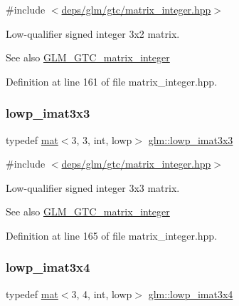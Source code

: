 {\ttfamily \#include $<$\hyperlink{matrix__integer_8hpp}{deps/glm/gtc/matrix\+\_\+integer.\+hpp}$>$}

Low-\/qualifier signed integer 3x2 matrix. \begin{DoxySeeAlso}{See also}
\hyperlink{group__gtc__matrix__integer}{G\+L\+M\+\_\+\+G\+T\+C\+\_\+matrix\+\_\+integer} 
\end{DoxySeeAlso}


Definition at line 161 of file matrix\+\_\+integer.\+hpp.

\mbox{\label{group__gtc__matrix__integer_ga4bfcfb2b121f76d9bff2fb2e4017173a}} 
\subsubsection{\texorpdfstring{lowp\+\_\+imat3x3}{lowp\_imat3x3}}
{\footnotesize\ttfamily typedef \hyperlink{structglm_1_1mat}{mat}$<$3, 3, int, lowp$>$ \hyperlink{group__gtc__matrix__integer_ga4bfcfb2b121f76d9bff2fb2e4017173a}{glm\+::lowp\+\_\+imat3x3}}



{\ttfamily \#include $<$\hyperlink{matrix__integer_8hpp}{deps/glm/gtc/matrix\+\_\+integer.\+hpp}$>$}

Low-\/qualifier signed integer 3x3 matrix. \begin{DoxySeeAlso}{See also}
\hyperlink{group__gtc__matrix__integer}{G\+L\+M\+\_\+\+G\+T\+C\+\_\+matrix\+\_\+integer} 
\end{DoxySeeAlso}


Definition at line 165 of file matrix\+\_\+integer.\+hpp.

\mbox{\label{group__gtc__matrix__integer_gacbdf7f35076058e4e9be49955ab3fbd3}} 
\subsubsection{\texorpdfstring{lowp\+\_\+imat3x4}{lowp\_imat3x4}}
{\footnotesize\ttfamily typedef \hyperlink{structglm_1_1mat}{mat}$<$3, 4, int, lowp$>$ \hyperlink{group__gtc__matrix__integer_gacbdf7f35076058e4e9be49955ab3fbd3}{glm\+::lowp\+\_\+imat3x4}}



